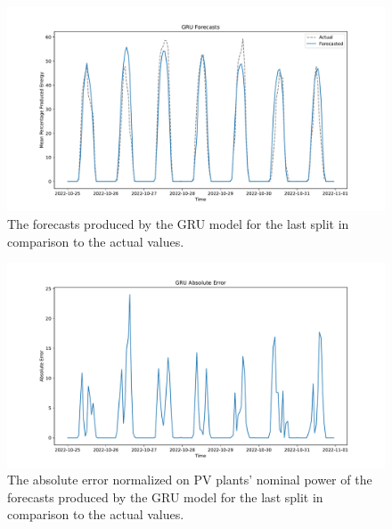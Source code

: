 \begin{figure}[H]
\centering
\includegraphics[width=1\textwidth]{images/production/GRU_percentage}
\caption{The forecasts produced by the GRU model for the last split in comparison to the actual values.}
\label{fig:productiongruhourlyforecasts}
\end{figure}

\begin{figure}[H]
\centering
\includegraphics[width=1\textwidth]{images/production/GRU_percentage_mae}
\caption{The absolute error normalized on PV plants' nominal power of the forecasts produced by the GRU model for the last split in comparison to the actual values.}
\label{fig:productiongruhourlyforecastsmae}
\end{figure}

